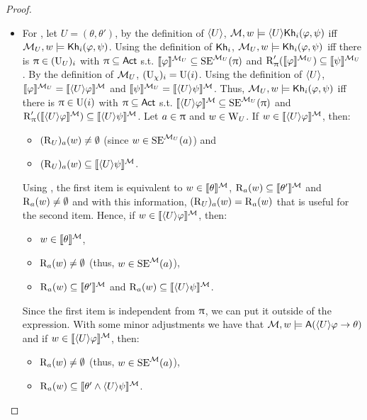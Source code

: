 \begin{proof}
\begin{itemize}
\item For , let $U = (\theta,\theta')$, by the definition of $\langle U \rangle$, $\mathcal{M},w \models \langle U \rangle{\sf Kh}_i(\varphi,\psi)$ iff $\mathcal{M}_{{U}},w \models {\sf Kh}_i(\varphi,\psi)$.
Using the definition of ${\sf Kh}_i$, $\mathcal{M}_{{U}},w \models {\sf Kh}_i(\varphi,\psi)$ iff there is $\uppi \in (\operatorname{U}_{{U}})_i$ with $\uppi \subseteq {\rm \sf Act}$ s.t. $\llbracket \varphi \rrbracket^{\mathcal{M}_{{U}}} \subseteq \operatorname{SE}^{\mathcal{M}_{{U}}}(\uppi)$ and $\operatorname{R}'_\uppi(\llbracket \varphi \rrbracket^{\mathcal{M}_{{U}}}) \subseteq \llbracket \psi \rrbracket^{\mathcal{M}_{{U}}}$.
By the definition of $\mathcal{M}_{{U}}$, $(\operatorname{U}_{{\chi}})_i=\operatorname{U}(i)$. Using the definition of $\langle U \rangle$, $\llbracket \varphi \rrbracket^{\mathcal{M}_{{U}}} = \llbracket \langle U \rangle\varphi \rrbracket^{\mathcal{M}}$ and $\llbracket \psi \rrbracket^{\mathcal{M}_{{U}}} = \llbracket \langle U \rangle\psi \rrbracket^{\mathcal{M}}$.
Thus, $\mathcal{M}_{{U}},w \models {\sf Kh}_i(\varphi,\psi)$ iff there is $\uppi \in \operatorname{U}(i)$ with $\uppi \subseteq {\rm \sf Act}$ s.t. $\llbracket \langle U \rangle\varphi \rrbracket^{\mathcal{M}} \subseteq \operatorname{SE}^{\mathcal{M}_{{U}}}(\uppi)$ and $\operatorname{R}'_\uppi(\llbracket \langle U \rangle\varphi \rrbracket^{\mathcal{M}}) \subseteq \llbracket \langle U \rangle\psi \rrbracket^{\mathcal{M}}$.
Let $a \in \uppi$ and $w \in \operatorname{W}_{{U}}$. If $w \in \llbracket \langle U \rangle\varphi \rrbracket^{\mathcal{M}}$, then:
\begin{itemize}
\item $(\operatorname{R}_{{U}})_a(w) \neq \emptyset$ (since $w \in \operatorname{SE}^{\mathcal{M}_{{U}}}(a)$) and
\item $(\operatorname{R}_{{U}})_a(w) \subseteq \llbracket \langle U \rangle\psi \rrbracket^{\mathcal{M}}$.
\end{itemize}
Using , the first item is equivalent to $w \in \llbracket \theta \rrbracket^{\mathcal{M}}$, $\operatorname{R}_a(w) \subseteq \llbracket \theta' \rrbracket^{\mathcal{M}}$ and $\operatorname{R}_a(w) \neq \emptyset$ and with this information, $(\operatorname{R}_{{U}})_a(w) = \operatorname{R}_a(w)$ that is useful for the second item.
Hence, if $w \in \llbracket \langle U \rangle\varphi \rrbracket^{\mathcal{M}}$, then:
\begin{itemize}
\item $w \in \llbracket \theta \rrbracket^{\mathcal{M}}$,
\item $\operatorname{R}_a(w) \neq \emptyset$ (thus, $w \in \operatorname{SE}^{\mathcal{M}}(a)$),
\item $\operatorname{R}_a(w) \subseteq \llbracket \theta' \rrbracket^{\mathcal{M}}$ and $\operatorname{R}_a(w) \subseteq \llbracket \langle U \rangle\psi \rrbracket^{\mathcal{M}}$.
\end{itemize}
Since the first item is independent from $\uppi$, we can put it outside of the expression.
With some minor adjustments we have that $\mathcal{M},w \models {\sf A}(\langle U \rangle\varphi \rightarrow \theta)$ and if $w \in \llbracket \langle U \rangle\varphi \rrbracket^{\mathcal{M}}$, then:
\begin{itemize}
\item $\operatorname{R}_a(w) \neq \emptyset$ (thus, $w \in \operatorname{SE}^{\mathcal{M}}(a)$),
\item $\operatorname{R}_a(w) \subseteq \llbracket \theta' \wedge \langle U \rangle\psi \rrbracket^{\mathcal{M}}$.
\end{itemize}


\end{itemize}
\end{proof}
